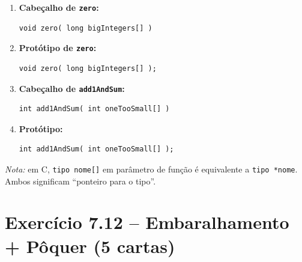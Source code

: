\documentclass[12pt,a4paper]{article}
\begin{document}
\begin{respostabox}
\begin{enumerate}[label=\textbf{\alph*)}]
\item \textbf{Cabeçalho de \texttt{zero}:}
\begin{lstlisting}
void zero( long bigIntegers[] )
\end{lstlisting}

\item \textbf{Protótipo de \texttt{zero}:}
\begin{lstlisting}
void zero( long bigIntegers[] );
\end{lstlisting}

\item \textbf{Cabeçalho de \texttt{add1AndSum}:}
\begin{lstlisting}
int add1AndSum( int oneTooSmall[] )
\end{lstlisting}

\item \textbf{Protótipo:}
\begin{lstlisting}
int add1AndSum( int oneTooSmall[] );
\end{lstlisting}
\end{enumerate}

\textit{Nota:} em C, \texttt{tipo nome[]} em parâmetro de função é equivalente a
\texttt{tipo *nome}. Ambos significam ``ponteiro para o tipo''.
\end{respostabox}

\section{Exercício 7.12 -- Embaralhamento + Pôquer (5 cartas)}
\end{document}

